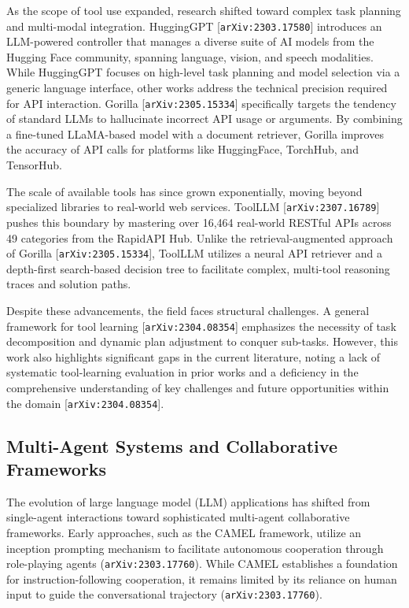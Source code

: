\documentclass[11pt]{article}
\begin{document}
As the scope of tool use expanded, research shifted toward complex task planning and multi-modal integration. HuggingGPT [\texttt{arXiv:2303.17580}] introduces an LLM-powered controller that manages a diverse suite of AI models from the Hugging Face community, spanning language, vision, and speech modalities. While HuggingGPT focuses on high-level task planning and model selection via a generic language interface, other works address the technical precision required for API interaction. Gorilla [\texttt{arXiv:2305.15334}] specifically targets the tendency of standard LLMs to hallucinate incorrect API usage or arguments. By combining a fine-tuned LLaMA-based model with a document retriever, Gorilla improves the accuracy of API calls for platforms like HuggingFace, TorchHub, and TensorHub.

The scale of available tools has since grown exponentially, moving beyond specialized libraries to real-world web services. ToolLLM [\texttt{arXiv:2307.16789}] pushes this boundary by mastering over 16,464 real-world RESTful APIs across 49 categories from the RapidAPI Hub. Unlike the retrieval-augmented approach of Gorilla [\texttt{arXiv:2305.15334}], ToolLLM utilizes a neural API retriever and a depth-first search-based decision tree to facilitate complex, multi-tool reasoning traces and solution paths.

Despite these advancements, the field faces structural challenges. A general framework for tool learning [\texttt{arXiv:2304.08354}] emphasizes the necessity of task decomposition and dynamic plan adjustment to conquer sub-tasks. However, this work also highlights significant gaps in the current literature, noting a lack of systematic tool-learning evaluation in prior works and a deficiency in the comprehensive understanding of key challenges and future opportunities within the domain [\texttt{arXiv:2304.08354}].

\subsection{Multi-Agent Systems and Collaborative Frameworks}

The evolution of large language model (LLM) applications has shifted from single-agent interactions toward sophisticated multi-agent collaborative frameworks. Early approaches, such as the CAMEL framework, utilize an inception prompting mechanism to facilitate autonomous cooperation through role-playing agents (\texttt{arXiv:2303.17760}). While CAMEL establishes a foundation for instruction-following cooperation, it remains limited by its reliance on human input to guide the conversational trajectory (\texttt{arXiv:2303.17760}).
\end{document}
